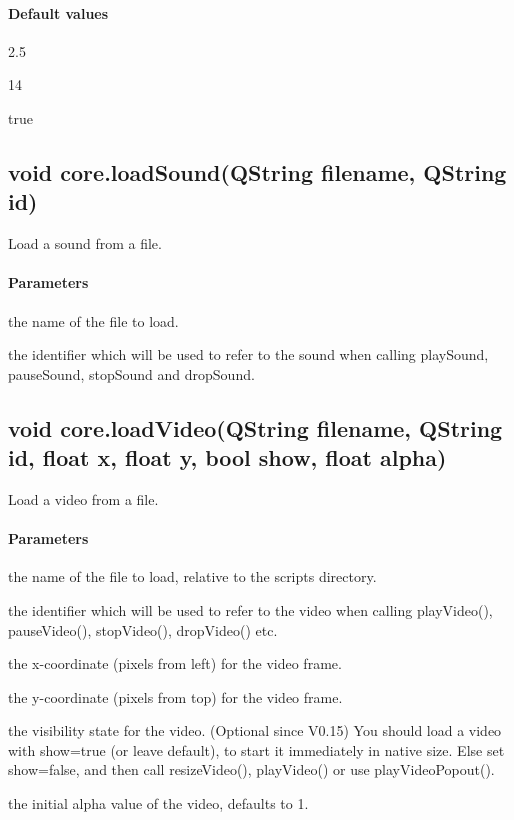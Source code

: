 \paragraph{Default values}
\begin{description}[align=right,labelwidth=3cm,leftmargin=3.2cm]
\item[\parameter{minRes}] 2.5
\item[\parameter{maxBright}] 14
\item[\parameter{visible}] true
\end{description}

\subsection{void core.loadSound(QString filename, QString id)}
\label{sec:ScriptingAPI:core:loadSound}
Load a sound from a file.

\paragraph{Parameters}
\begin{description}[align=right,labelwidth=3cm,leftmargin=3.2cm]
\item[\parameter{filename}] the name of the file to load.
\item[\parameter{id}] the identifier which will be used to refer to the sound when calling playSound, pauseSound, stopSound and dropSound.
\end{description}

\subsection{void core.loadVideo(QString filename, QString id, float x, float y, bool show, float alpha)}
\label{sec:ScriptingAPI:core:loadVideo}
Load a video from a file.

\paragraph{Parameters}
\begin{description}[align=right,labelwidth=3cm,leftmargin=3.2cm]
\item[\parameter{filename}] the name of the file to load, relative to the scripts directory.
\item[\parameter{id}] the identifier which will be used to refer to the video when calling playVideo(), pauseVideo(), stopVideo(), dropVideo() etc.
\item[\parameter{x}] the x-coordinate (pixels from left) for the video frame.
\item[\parameter{y}] the y-coordinate (pixels from top) for the video frame.
\item[\parameter{show}] the visibility state for the video. (Optional since V0.15) You should load a video with show=true (or leave default), to start it immediately in native size. Else set show=false, and then call resizeVideo(), playVideo() or use playVideoPopout().
\item[\parameter{alpha}] the initial alpha value of the video, defaults to 1.
\end{description}

